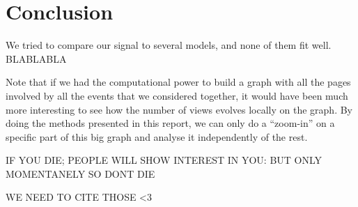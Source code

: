\documentclass[conference]{IEEEtran}
\begin{document}
\section{Conclusion} \label{conclusion}

We tried to compare our signal to several models, and none of them fit well. 
BLABLABLA
\medskip

Note that if we had the computational power to build a graph with all the pages involved by all the events that we considered together, it would have been much more interesting to see how the number of views evolves locally on the graph. By doing the methods presented in this report, we can only do a “zoom-in” on a specific part of this big graph and analyse it independently of the rest. 

IF YOU DIE; PEOPLE WILL SHOW INTEREST IN YOU: BUT ONLY MOMENTANELY SO DONT DIE

WE NEED TO CITE THOSE <3

\cite{laplacian}  
\cite{signalprocessing}
\cite{clustering}



\end{document}
